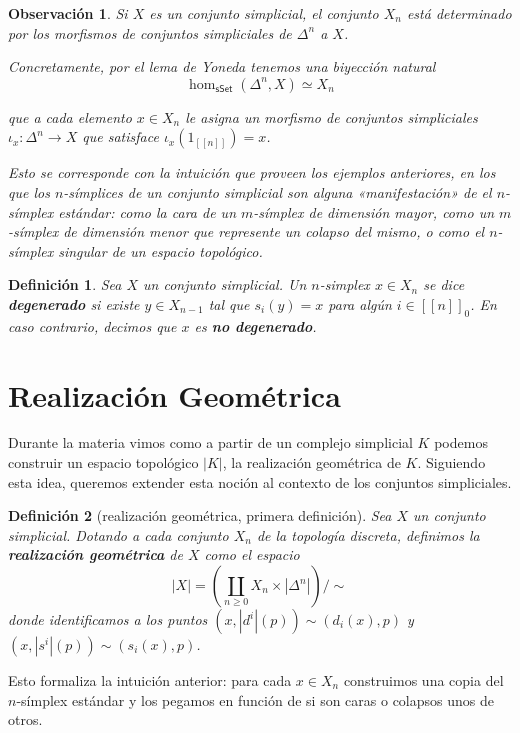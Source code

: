 \documentclass[11pt]{report}
\theoremstyle{colored}
\newtheorem{definition}{Definición}[section]
\newtheorem{remark}{Observación}[section]
\newcommand{\nat}[1]{[\![#1]\!]}
\newcommand{\ord}[1]{\nat{#1}}
\newcommand{\natzero}[1]{\nat{#1}_0}
\newcommand{\cat}[1]{\mathsf{#1}}
\renewcommand{\ss}[1]{\Delta^{#1}}
\begin{document}
\begin{remark} Si $X$ es un conjunto simplicial, el conjunto $X_n$ está determinado por los morfismos de conjuntos simpliciales de $\ss{n}$ a $X$. 

Concretamente, por el lema de Yoneda tenemos una biyección natural
\[
\hom_{\cat{sSet}}(\ss{n},X) \simeq X_n
\]

que a cada elemento $x \in X_n$ le asigna un morfismo de conjuntos simpliciales $\iota_x : \ss{n} \to X$ que satisface $\iota_x(1_{\ord{n}}) = x$. 

Esto se corresponde con la intuición que proveen los ejemplos anteriores, en los que los $n$-símplices de un conjunto simplicial son alguna «manifestación» de el $n$-símplex estándar: como la cara de un $m$-símplex de dimensión mayor, como un $m$-símplex de dimensión menor que represente un colapso del mismo, o como el $n$-símplex singular de un espacio topológico.\\
\end{remark}

\begin{definition} Sea $X$ un conjunto simplicial. Un $n$-simplex $x \in X_n$ se dice \textbf{degenerado} si existe $y \in X_{n-1}$ tal que $s_i(y) = x$ para algún $i \in \natzero{n}$. En caso contrario, decimos que $x$ es \textbf{no degenerado}.
\end{definition}

\section{Realización Geométrica}

Durante la materia vimos como a partir de un complejo simplicial $K$ podemos construir un espacio topológico $|K|$, la realización geométrica de $K$. Siguiendo esta idea, queremos extender esta noción al contexto de los conjuntos simpliciales.

\begin{definition}[realización geométrica, primera definición] Sea $X$ un conjunto simplicial. Dotando a cada conjunto $X_n$ de la topología discreta, definimos la \textbf{realización geométrica} de $X$ como el espacio
\[
|X| = \left(\coprod_{n \geq 0}X_n \times |\ss{n}|\right)\Big/\sim
\]
donde identificamos a los puntos $(x,|d^i|(p)) \sim (d_i(x),p)$ y $(x,|s^i|(p)) \sim (s_i(x),p)$.
\end{definition}

Esto formaliza la intuición anterior: para cada $x \in X_n$ construimos una copia del $n$-símplex estándar y los pegamos en función de si son caras o colapsos unos de otros.
\end{document}
